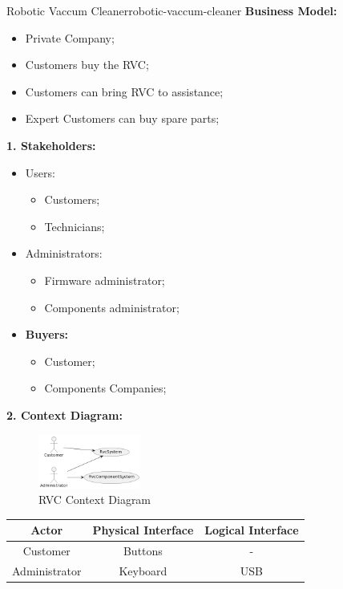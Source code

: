 \documentclass[12pt]{article}
\begin{document}
\begin{example}{Robotic Vaccum Cleaner}{robotic-vaccum-cleaner}
  \textbf{Business Model:}
  \begin{itemize}
    \item Private Company;
    \item Customers buy the RVC;
    \item Customers can bring RVC to assistance;
    \item Expert Customers can buy spare parts;
  \end{itemize}
  \textbf{1. Stakeholders:}
  \begin{itemize}
    \item Users:
      \begin{itemize}
        \item Customers;
        \item Technicians;
      \end{itemize}
    \item Administrators:
      \begin{itemize}
        \item Firmware administrator;
        \item Components administrator;
      \end{itemize}
    \item \textbf{Buyers:}
      \begin{itemize}
        \item Customer;
        \item Components Companies;
      \end{itemize}
  \end{itemize}
  \textbf{2. Context Diagram:}
  \begin{figure}[H]
    \centering
    \includegraphics[width=0.3\textwidth]{rvc-context-diagram.png}
    \caption{RVC Context Diagram}
    \label{fig:rvc-context-diagram}
  \end{figure}
  \begin{table}[H]
    \centering
    \begin{tabular}{|c|c|c|}
      \hline
      \textbf{Actor} & \textbf{Physical Interface} & \textbf{Logical Interface} \\
      \hline
      Customer & Buttons & - \\
      \hline
      Administrator & Keyboard & USB \\

\end{tabular}
\end{table}
\end{example}
\end{document}
